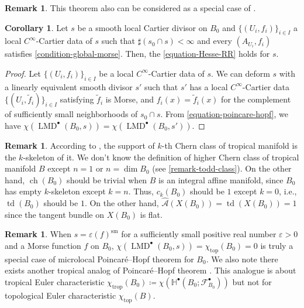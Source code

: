 \documentclass[a4paper,dvipdfmx,reqno,12pt]{amsart}
\theoremstyle{definition}
\newtheorem{corollary}[theorem]{Corollary}
\newtheorem{remark}[theorem]{Remark}
\newcommand{\deq}{\coloneqq}
\newcommand{\vep}{\varepsilon}%
\newcommand{\mb}[1]{\mathbb{#1}}%
\newcommand{\mcal}[1]{\mathcal{#1}}%
\newcommand{\opn}[1]{\operatorname{#1}}
\numberwithin{equation}{section}
\begin{document}
\begin{remark} \label{rmk: integral_mirror}
This theorem also can be considered as
a special case of \cite{MR3656481,MR4301560}.
\end{remark}

\begin{corollary}
Let $s$ be a smooth local Cartier divisor on $B_0$ and 
$\{(U_i,f_i)\}_{i\in I}$ a local $C^{\infty}$-Cartier 
data of $s$ such that $\sharp (s_0\cap s)<\infty$ and
every $(A_{U_i},f_i)$ satisfies \cref{condition-global-morse}.
Then, the \cref{equation-Hesse-RR} holds for $s$.
\end{corollary}

\begin{proof}
Let $\{(U_i,f_i)\}_{i\in I}$ be a local $C^{\infty}$-Cartier
data of $s$. We can deform $s$ with a linearly equivalent
smooth divisor $s'$ 
such that $s'$ has a local $C^{\infty}$-Cartier data 
$\{(U_i,\tilde{f}_i)\}_{i\in I}$ satisfying 
$\tilde{f}_i$ is Morse, and 
$f_i(x)=\tilde{f}_i(x)$ for the complement of 
sufficiently small neighborhoods of $s_0\cap s$. 
From \cref{equation-poincare-hopf}, we have
$\chi(\opn{LMD}^{\bullet}(B_0,s))
=\chi(\opn{LMD}^{\bullet}(B_0,s'))$.
\end{proof}



\begin{remark}

According to \cite[5.3]{mikhalkinTropicalGeometryIts2006},
the support of $k$-th Chern class of tropical manifold is 
the $k$-skeleton of it.
We don't know the definition of higher Chern class of tropical manifold $B$ except
$n=1$ or $n=\dim B_0$ (see \cref{remark-todd-class}).
On the other hand, $\opn{ch}(B_0)$ should be trivial when $B$ is
an integral affine manifold, since $B_0$ has empty
$k$-skeleton except $k=n$.
Thus, $c_{k}(B_0)$ should be $1$ except $k=0$, 
i.e., $\opn{td}(B_0)$ should be $1$. 
On the other hand,
 $\hat{\mcal{A}}(X(B_0))=\opn{td}(X(B_0))=1$
since the tangent bundle on $X(B_0)$ is flat.
\end{remark}

\begin{remark}
When $s=\vep (f)^{\opn{sm}}$ for a sufficiently small
positive real number $\vep >0$ and 
a Morse function $f$ on $B_0$, 
$\chi(\opn{LMD}^{\bullet}(B_0,s))=
\chi_{\opn{top}}(B_0)=0$ is 
truly a special case of microlocal Poincar\'e--Hopf theorem for $B_0$.
We also note there exists another tropical analog of Poincar\'e--Hopf theorem
  \cite{MR4540954}. This analogue is about tropical Euler characteristic
$\chi_{\opn{trop}}(B_0)\deq 
\chi(\mb{H}^{\bullet}(B_0;\mcal{F}_{B_0}^{\bullet}))$
  but not for topological Euler characteristic $\chi_{\opn{top}}(B)$.
\end{remark}
\end{document}
